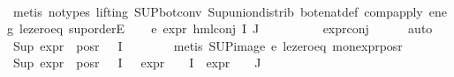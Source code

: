 \begin{isabellebody}
\ \ \ \ \isamarkupfalse%
\ {\isacharparenleft}{\kern0pt}metis\ {\isacharparenleft}{\kern0pt}no{\isacharunderscore}{\kern0pt}types{\isacharcomma}{\kern0pt}\ lifting{\isacharparenright}{\kern0pt}\ SUP{\isacharunderscore}{\kern0pt}bot{\isacharunderscore}{\kern0pt}conv{\isacharparenleft}{\kern0pt}{}{\isacharparenright}{\kern0pt}\ Sup{\isacharunderscore}{\kern0pt}union{\isacharunderscore}{\kern0pt}distrib\ bot{\isacharunderscore}{\kern0pt}enat{\isacharunderscore}{\kern0pt}def\ comp{\isacharunderscore}{\kern0pt}apply\ e{}{\isacharunderscore}{\kern0pt}neg\ le{\isacharunderscore}{\kern0pt}zero{\isacharunderscore}{\kern0pt}eq\ sup{\isachardot}{\kern0pt}orderE{\isacharparenright}{\kern0pt}\isanewline
\ \ \isamarkupfalse%
\ e{}{\isacharcolon}{\kern0pt}\ {\isachardoublequoteopen}expr{\isacharunderscore}{\kern0pt}{}\ {\isacharparenleft}{\kern0pt}hml{\isacharunderscore}{\kern0pt}conj\ I\ J\ {\isasymPhi}{\isacharparenright}{\kern0pt}\ {\isasymle}\ {}{\isachardoublequoteclose}\ \isanewline
\ \ \ \ \isamarkupfalse%
\ expr{\isacharunderscore}{\kern0pt}{}{\isacharunderscore}{\kern0pt}conj\isanewline
\ \ \ \ \isamarkupfalse%
\ auto\isanewline
\ \ \isamarkupfalse%
\ {\isachardoublequoteopen}Sup\ {\isacharparenleft}{\kern0pt}expr{\isacharunderscore}{\kern0pt}{}\ {\isacharbackquote}{\kern0pt}\ {\isacharparenleft}{\kern0pt}pos{\isacharunderscore}{\kern0pt}r\ {\isacharparenleft}{\kern0pt}{\isasymPhi}\ {\isacharbackquote}{\kern0pt}\ I{\isacharparenright}{\kern0pt}{\isacharparenright}{\kern0pt}{\isacharparenright}{\kern0pt}\ {\isasymle}\ {}{\isachardoublequoteclose}\isanewline
\ \ \ \ \isamarkupfalse%
\ {\isacharparenleft}{\kern0pt}metis\ SUP{\isacharunderscore}{\kern0pt}image\ e{}{\isacharunderscore}{\kern0pt}{}\ le{\isacharunderscore}{\kern0pt}zero{\isacharunderscore}{\kern0pt}eq\ mon{\isacharunderscore}{\kern0pt}expr{\isacharunderscore}{\kern0pt}{}{\isacharunderscore}{\kern0pt}pos{\isacharunderscore}{\kern0pt}r{\isacharparenright}{\kern0pt}\isanewline
\ \ \isamarkupfalse%
\ {\isachardoublequoteopen}Sup\ {\isacharparenleft}{\kern0pt}{\isacharparenleft}{\kern0pt}expr{\isacharunderscore}{\kern0pt}{}\ {\isacharbackquote}{\kern0pt}\ {\isacharparenleft}{\kern0pt}pos{\isacharunderscore}{\kern0pt}r\ {\isacharparenleft}{\kern0pt}{\isasymPhi}\ {\isacharbackquote}{\kern0pt}\ I{\isacharparenright}{\kern0pt}{\isacharparenright}{\kern0pt}{\isacharparenright}{\kern0pt}\ \ {\isasymunion}\ {\isacharparenleft}{\kern0pt}expr{\isacharunderscore}{\kern0pt}{}\ {\isasymcirc}\ {\isasymPhi}{\isacharparenright}{\kern0pt}\ {\isacharbackquote}{\kern0pt}\ I\ {\isasymunion}\ {\isacharparenleft}{\kern0pt}expr{\isacharunderscore}{\kern0pt}{}\ {\isasymcirc}\ {\isasymPhi}{\isacharparenright}{\kern0pt}\ {\isacharbackquote}{\kern0pt}\ J{\isacharparenright}{\kern0pt}\ {\isasymle}\ {}{\isachardoublequoteclose}\isanewline

\end{isabellebody}
